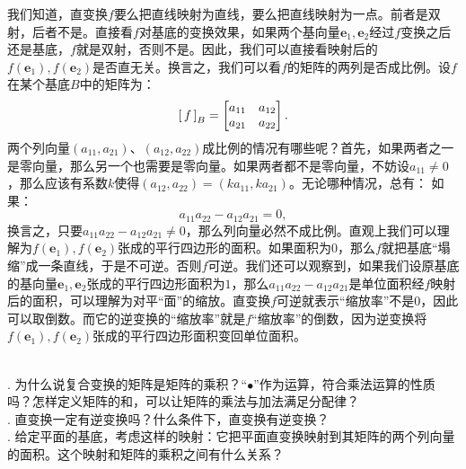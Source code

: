 \documentclass[12pt,UTF8,fontset=none]{ctexbook}
\begin{document}
我们知道，直变换$f$要么把直线映射为直线，要么把直线映射为一点。前者是双射，后者不是。直接看$f$对基底的变换效果，如果两个基向量$\mathbf{e}_1,\mathbf{e}_2$经过$f$变换之后还是基底，$f$就是双射，否则不是。因此，我们可以直接看映射后的$f(\mathbf{e}_1),f(\mathbf{e}_2)$是否直无关。换言之，我们可以看$f$的矩阵的两列是否成比例。设$f$在某个基底$B$中的矩阵为：
$$
\bmat{f}[B] = \begin{bmatrix}
    a_{11} & a_{12} \\
    a_{21} & a_{22} 
\end{bmatrix}.
$$
两个列向量$(a_{11},a_{21})$、$(a_{12},a_{22})$成比例的情况有哪些呢？首先，如果两者之一是零向量，那么另一个也需要是零向量。如果两者都不是零向量，不妨设$a_{11}\neq 0$，那么应该有系数$k$使得$(a_{12},a_{22}) = (ka_{11},ka_{21})$。无论哪种情况，总有：
如果：
$$ a_{11} a_{22} - a_{12} a_{21} = 0,$$
换言之，只要$a_{11} a_{22} - a_{12} a_{21}\neq 0$，那么列向量必然不成比例。直观上我们可以理解为$f(\mathbf{e}_1),f(\mathbf{e}_2)$张成的平行四边形的面积。如果面积为$0$，那么$f$就把基底“塌缩”成一条直线，于是不可逆。否则$f$可逆。我们还可以观察到，如果我们设原基底的基向量$\mathbf{e}_1,\mathbf{e}_2$张成的平行四边形面积为$1$，那么$a_{11} a_{22} - a_{12} a_{21}$是单位面积经$f$映射后的面积，可以理解为对平“面”的缩放。直变换$f$可逆就表示“缩放率”不是$0$，因此可以取倒数。而它的逆变换的“缩放率”就是$f$“缩放率”的倒数，因为逆变换将$f(\mathbf{e}_1),f(\mathbf{e}_2)$张成的平行四边形面积变回单位面积。


\begin{sk}
    \mbox{} \\
    . 为什么说复合变换的矩阵是矩阵的乘积？“$\bullet$”作为运算，符合乘法运算的性质吗？怎样定义矩阵的和，可以让矩阵的乘法与加法满足分配律？\\
    . 直变换一定有逆变换吗？什么条件下，直变换有逆变换？\\
    . 给定平面的基底，考虑这样的映射：它把平面直变换映射到其矩阵的两个列向量的面积。这个映射和矩阵的乘积之间有什么关系？
\end{sk}
\end{document}
